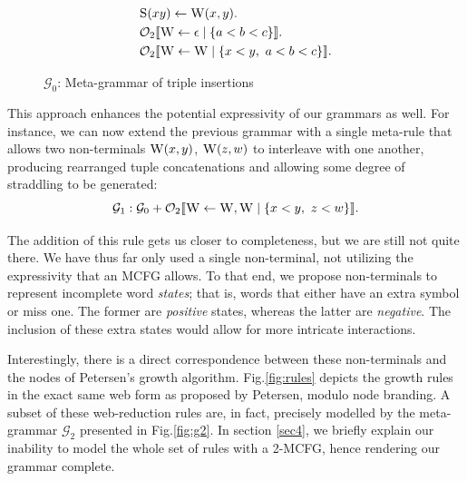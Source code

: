 \documentclass{llncs}
\newcommand\s{\textsc}
\newcommand{\Orderr}[5]{
	\mathcal{#1}_{#5}\llbracket #2 \leftarrow #3 \mid \{ #4 \} \rrbracket.
}
\newcommand{\Or}[4]{\Orderr{O}{#1}{#2}{#3}{#4}}
\begin{document}
\begin{figure}
  \centering
  \begin{align*}
	&\s{S}(xy) \leftarrow \s{W}(x,y). \\
	&\Or{\s{W}}{\epsilon}{a < b < c}{2} \\
	&\Or{\s{W}}{\s{W}}{x < y,\ a < b < c}{2}
	\end{align*}
  \caption{$\mathcal{G}_0$: Meta-grammar of triple insertions}  
	\label{fig:meta-ins}
\end{figure}

This approach enhances the potential expressivity of our grammars as well. For instance, we can now extend the previous grammar with a single meta-rule that allows two non-terminals $\s{W}(x,y)$, $\s{W}(z,w)$ to interleave with one another, producing rearranged tuple concatenations and allowing some degree of straddling to be generated:
\[
\mathcal{G}_1: \mathcal{G}_0 + \Or{\s{W}}{\s{W}, \s{W}}{x < y,\ z < w}{2}
\]

The addition of this rule gets us closer to completeness, but we are still not quite there. We have thus far only used a single non-terminal, not utilizing the expressivity that an MCFG allows. To that end, we propose non-terminals to represent incomplete word \textit{states}; that is, words that either have an extra symbol or miss one. The former are \textit{positive} states, whereas the latter are \textit{negative}. The inclusion of these extra states would allow for more intricate interactions.

Interestingly, there is a direct correspondence between these non-terminals and the nodes of Petersen's growth algorithm\cite{petersen}. Fig.\ref{fig:rules} depicts the growth rules in the exact same web form as proposed by Petersen, modulo node branding. A subset of these web-reduction rules are, in fact, precisely modelled by the meta-grammar $\mathcal{G}_2$ presented in Fig.\ref{fig:g2}. In section \ref{sec4}, we briefly explain our inability to model the whole set of rules with a 2-MCFG, hence rendering our grammar complete.
\end{document}
